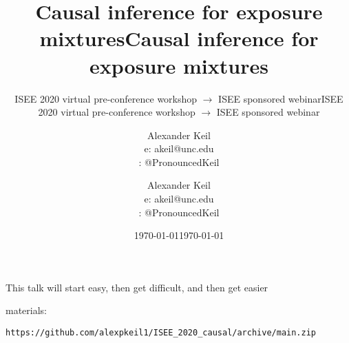 \documentclass[aspectratio=169]{beamer}
\title{Causal inference for exposure mixtures}
\subtitle{ISEE 2020 virtual pre-conference workshop $\rightarrow$ ISEE sponsored webinar}
\author{Alexander Keil\\e: akeil@unc.edu\\  \faTwitter: @PronouncedKeil}
\date{\today}
\begin{document}
\frame{\maketitle}

\begin{frame}[t, fragile]
  \frametitle{}
    This talk will start easy, then get difficult, and then get easier
    \bigskip
    
    
    materials: 
\begin{lstlisting}
https://github.com/alexpkeil1/ISEE_2020_causal/archive/main.zip
\end{lstlisting}

\end{frame}



















\title{Causal inference for exposure mixtures}
\subtitle{ISEE 2020 virtual pre-conference workshop $\rightarrow$ ISEE sponsored webinar}
\author{Alexander Keil\\e: akeil@unc.edu\\  \faTwitter: @PronouncedKeil}
\date{\today}
\frame{\maketitle}
\end{document}
